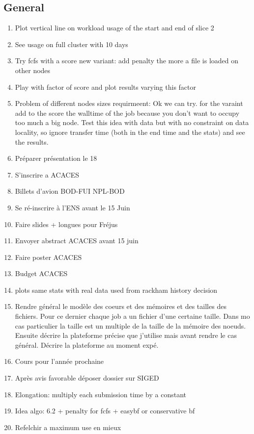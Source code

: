 \documentclass[a4paper]{article}
\begin{document}
	\subsection{General}
		\begin{enumerate}
			\item Plot vertical line on workload usage of the start and end of slice 2
			\item See usage on full cluster with 10 days
			\item Try fcfs with a score new variant: add penalty the more a file is loaded on other nodes
			\item Play with factor of score and plot results varying this factor
			\item Problem of different nodes sizes requirmeent: Ok we can try. for the varaint add to the score the walltime of the job because you don't want to occupy too much a big node. Test this idea with data but with no constraint on data locality, so ignore transfer time (both in the end time and the stats) and see the results.
			\item Préparer présentation le 18
			\item S'inscrire a ACACES
			\item Billets d'avion BOD-FUI NPL-BOD
			\item Se ré-inscrire à l'ENS avant le 15 Juin
			\item Faire slides + longues pour Fréjus
			\item Envoyer abstract ACACES avant 15 juin
			\item Faire poster ACACES
			\item Budget ACACES
			\item plots same stats with real data used from rackham history decision
			\item Rendre général le modèle des coeurs et des mémoires et des tailles des fichiers. Pour ce dernier chaque job a un fichier d'une certaine taille. Dans mo cas particulier la taille est un multiple de la taille de la mémoire des noeuds. Ensuite décrire la plateforme précise que j'utilise mais avant rendre le cas général. Décrire la plateforme au moment expé.
			\item Cours pour l'année prochaine
			\item Après avis favorable déposer dossier sur SIGED
			\item Elongation: multiply each submission time by a constant
			\item Idea algo: 6.2 + penalty for fcfs + easybf or conservative bf
			\item Refelchir a maximum use en mieux

\end{enumerate}
\end{document}
